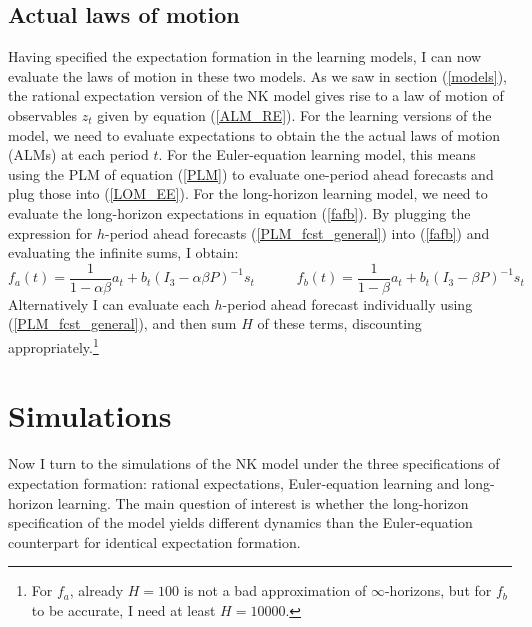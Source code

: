 \documentclass[11pt]{article}
\renewcommand{\[}{\begin{equation}}
\renewcommand{\]}{\end{equation}}
\begin{document}
\subsection{Actual laws of motion}\label{ALMs}
Having specified the expectation formation in the learning models, I can now evaluate the laws of motion in these two models. As we saw in section (\ref{models}), the rational expectation version of the NK model gives rise to a law of motion of observables $z_t$ given by equation (\ref{ALM_RE}). For the learning versions of the model, we need to evaluate expectations to obtain the the actual laws of motion (ALMs) at each period $t$. For the Euler-equation learning model, this means using the PLM of equation (\ref{PLM}) to evaluate one-period ahead forecasts and plug those into (\ref{LOM_EE}). For the long-horizon learning model, we need to evaluate the long-horizon expectations in equation (\ref{fafb}). By plugging the expression for $h$-period ahead forecasts (\ref{PLM_fcst_general}) into (\ref{fafb}) and evaluating the infinite sums, I obtain:
\begin{equation}
f_a(t) = \frac{1}{1-\alpha\beta}a_{t}  + b_{t}(I_3 - \alpha\beta P)^{-1}s_t \quad \quad \quad f_b(t) = \frac{1}{1-\beta}a_{t}  + b_{t}(I_3 - \beta P)^{-1}s_t  \label{fafb_analytical_general}
\end{equation}
Alternatively I can evaluate each $h$-period ahead forecast individually using (\ref{PLM_fcst_general}), and then sum $H$ of these terms, discounting appropriately.\footnote{For $f_a$, already $H=100$ is not a bad approximation of $\infty$-horizons, but for $f_b$ to be accurate, I need at least $H=10000$.}
\section{Simulations}	\label{simulations}
Now I turn to the simulations of the NK model under the three specifications of expectation formation: rational expectations, Euler-equation learning and long-horizon learning. The main question of interest is whether the long-horizon specification of the model yields different dynamics than the Euler-equation counterpart for identical expectation formation. 
\end{document}
